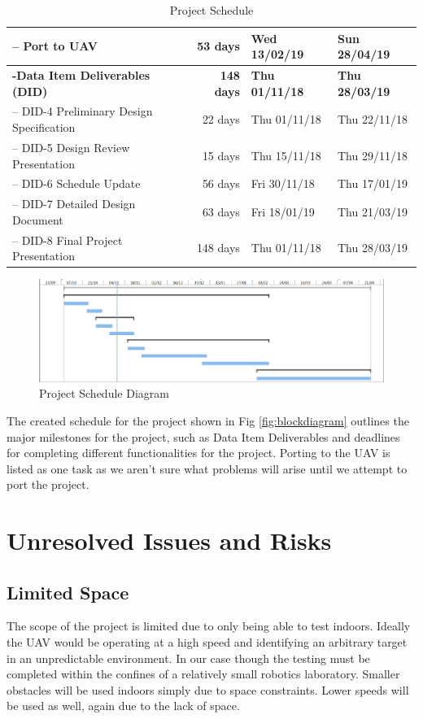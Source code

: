 \documentclass{article}
\begin{document}
\begin{table}[H]
\begin{tabular}{|l|r|l|l|}
		-- Port to UAV                                      & 53 days           & Wed 13/02/19          & Sun 28/04/19          \\ \hline
		\textbf{-Data Item Deliverables (DID)}		    & \textbf{148 days} & \textbf{Thu 01/11/18} & \textbf{Thu 28/03/19} \\ \hline
		-- DID-4 Preliminary Design Specification	    & 22 days		& Thu 01/11/18		& Thu 22/11/18		\\ \hline
		-- DID-5 Design Review Presentation		    & 15 days		& Thu 15/11/18		& Thu 29/11/18		\\ \hline
		-- DID-6 Schedule Update			    & 56 days		& Fri 30/11/18		& Thu 17/01/19		\\ \hline
		-- DID-7 Detailed Design Document		    & 63 days		& Fri 18/01/19		& Thu 21/03/19		\\ \hline
		-- DID-8 Final Project Presentation		    & 148 days		& Thu 01/11/18		& Thu 28/03/19		\\ \hline

	\end{tabular}
	\caption{Project Schedule}
	\label{table:projectscheduletable}
\end{table}

\begin{figure}[H]
	\centering
	\includegraphics[width=\linewidth]{ScheduleDiagram}
	\caption{Project Schedule Diagram}
	\label{fig:schedulediagram}
\end{figure}

The created schedule for the project shown in Fig \ref{fig:blockdiagram} outlines the major milestones for the project, such as Data Item Deliverables and deadlines for completing different functionalities for the project. Porting to the UAV is listed as one task as we aren't sure what problems will arise until we attempt to port the project.  

\section{Unresolved Issues and Risks}

	\subsection{Limited Space}
	The scope of the project is limited due to only being able to test indoors. Ideally the UAV would be operating at a high speed and identifying an arbitrary target in an unpredictable environment. In our case though the testing must be completed within the confines of a relatively small robotics laboratory. Smaller obstacles will be used indoors simply due to space constraints. Lower speeds will be used as well, again due to the lack of space. 
\end{document}
